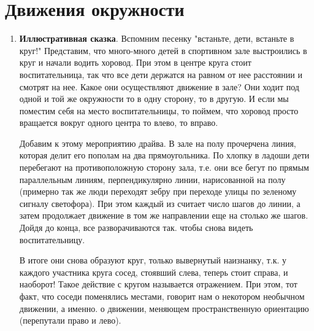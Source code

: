 \section{Движения окружности}



\begin{enumerate}
\item \textbf{Иллюстративная сказка}. Вспомним песенку "встаньте, дети, встаньте в круг!" Представим, что много-много детей в спортивном зале выстроились в круг и начали водить хоровод. При этом в центре круга стоит воспитательница, так что все дети держатся на равном от нее расстоянии и смотрят на нее. Какое они осуществляют движение в зале? Они ходит под одной и той же окружности то в одну сторону, то в другую. И если мы поместим себя на место воспитательницы, то поймем, что хоровод просто вращается вокруг одного центра то влево, то вправо.

Добавим к этому мероприятию драйва. В зале на полу прочерчена линия, которая делит его пополам на два прямоугольника. По хлопку в ладоши дети перебегают на противоположную сторону зала, т.е. они все бегут по прямым параллельным линиям, перпендикулярно линии, нарисованной на полу (примерно так же люди переходят зебру при переходе улицы по зеленому сигналу светофора). При этом каждый из считает число шагов до линии, а затем продолжает движение в том же направлении еще на столько же шагов. Дойдя до конца, все разворачиваются так. чтобы снова видеть воспитательницу.

В итоге они снова образуют круг, только вывернутый наизнанку, т.к. у каждого участника круга сосед, стоявший слева, теперь стоит справа, и наоборот! Такое действие с кругом называется отражением. При этом, тот факт, что соседи поменялись местами, говорит нам о некотором необычном движении, а именно. о движении, меняющем пространственную ориентацию (перепутали право и лево).


\end{enumerate}
